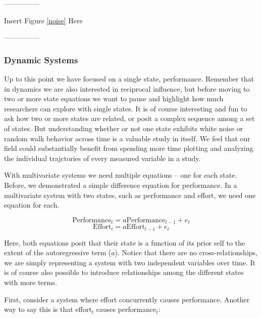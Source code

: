 \documentclass[english,,man]{apa6}
\theoremstyle{definition}
\theoremstyle{definition}
\theoremstyle{definition}
\theoremstyle{remark}
\begin{document}
\begin{center}

---------------

Insert Figure \ref{noise} Here

---------------

\end{center}

\hypertarget{dynamic-systems}{%
\subsubsection{Dynamic Systems}\label{dynamic-systems}}

Up to this point we have focused on a single state, performance.
Remember that in dynamics we are also interested in reciprocal
influence, but before moving to two or more state equations we want to
pause and highlight how much researchers can explore with single states.
It is of course interesting and fun to ask how two or more states are
related, or posit a complex sequence among a set of states. But
understanding whether or not one state exhibits white noise or random
walk behavior across time is a valuable study in itself. We feel that
our field could substantially benefit from spending more time plotting
and analyzing the individual trajctories of every measured variable in a
study.

With multivariate systems we need multiple equations -- one for each
state. Before, we demonstrated a simple difference equation for
performance. In a multivariate system with two states, such as
performance and effort, we need one equation for each.

\begin{equation}
\label{sysy}
\textrm{Performance}_{t} = a \textrm{Performance}_{t - 1} + e_{t}
\end{equation} \begin{equation}
\label{sysx}
\textrm{Effort}_{t} = a \textrm{Effort}_{t - 1} + e_{t}
\end{equation}

\noindent Here, both equations posit that their state is a function of
its prior self to the extent of the autoregressive term (\(a\)). Notice
that there are no cross-relationships, we are simply representing a
system with two independent variables over time. It is of course also
possible to introduce relationships among the different states with more
terms.

First, consider a system where effort concurrently causes performance.
Another way to say this is that effort\(_t\) causes performance\(_t\):
\end{document}
